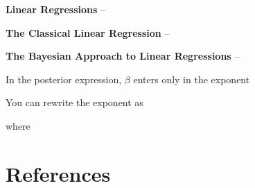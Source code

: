\documentclass[11pt]{article}
\begin{document}
\vspace{\baselineskip}
{\bfseries Linear Regressions} --


\vspace{\baselineskip}
{\bfseries The Classical Linear Regression} --


\vspace{\baselineskip}
{\bfseries The Bayesian Approach to Linear Regressions} --





In the posterior expression, $\beta$ enters only in the exponent

%

You can rewrite the exponent as

%

where


\vspace{\baselineskip}
\section*{References}



\end{document}
